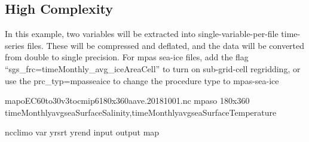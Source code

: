 \documentclass[letterpaper,10pt,english]{sphinxmanual}
\begin{document}
\subsection{High Complexity}
\label{\detokenize{mpas_regrid:high-complexity}}
In this example, two variables will be extracted into single-variable-per-file time-series files.
These will be compressed and deflated, and the data will be converted from double to single precision.
For mpas sea-ice files, add the flag “\textendash{}sgs\_frc=timeMonthly\_avg\_iceAreaCell” to turn on sub-grid-cell regridding,
or use the \textendash{}prc\_typ=mpasseaice to change the procedure type to mpas-sea-ice

\begin{sphinxVerbatim}[commandchars=\\\{\}]
map\PYGZus{}oEC60to30v3\PYGZus{}to\PYGZus{}cmip6\PYGZus{}180x360\PYGZus{}aave.20181001.nc                       
mpaso                                                                 
180x360                                                              
timeMonthly\PYGZus{}avg\PYGZus{}seaSurfaceSalinity,timeMonthly\PYGZus{}avg\PYGZus{}seaSurfaceTemperature   
                                                                      
                                                                        
                                            

ncclimo 
   
  \PYGZhy{}\PYGZhy{}var 
  \PYGZhy{}\PYGZhy{}yr\PYGZus{}srt 
  \PYGZhy{}\PYGZhy{}yr\PYGZus{}end 
  \PYGZhy{}\PYGZhy{}input 
  \PYGZhy{}\PYGZhy{}output 
  \PYGZhy{}\PYGZhy{}map
\end{sphinxVerbatim}



\renewcommand{\indexname}{Index}
\printindex
\end{document}
